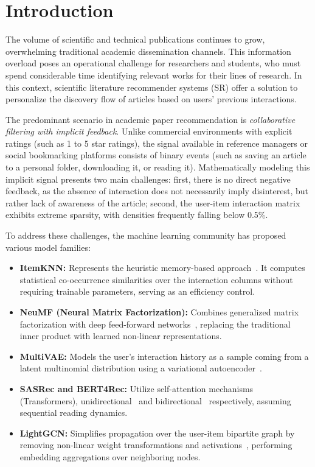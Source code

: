 \documentclass[journal]{IEEEtran}
\begin{document}
\section{Introduction}
The volume of scientific and technical publications continues to grow, overwhelming traditional academic dissemination channels. This information overload poses an operational challenge for researchers and students, who must spend considerable time identifying relevant works for their lines of research. In this context, scientific literature recommender systems (SR) offer a solution to personalize the discovery flow of articles based on users' previous interactions.

The predominant scenario in academic paper recommendation is \emph{collaborative filtering with implicit feedback}. Unlike commercial environments with explicit ratings (such as 1 to 5 star ratings), the signal available in reference managers or social bookmarking platforms consists of binary events (such as saving an article to a personal folder, downloading it, or reading it). Mathematically modeling this implicit signal presents two main challenges: first, there is no direct negative feedback, as the absence of interaction does not necessarily imply disinterest, but rather lack of awareness of the article; second, the user-item interaction matrix exhibits extreme sparsity, with densities frequently falling below 0.5\%.

To address these challenges, the machine learning community has proposed various model families:
\begin{itemize}
    \item \textbf{ItemKNN:} Represents the heuristic memory-based approach~\cite{sarwar2001item}. It computes statistical co-occurrence similarities over the interaction columns without requiring trainable parameters, serving as an efficiency control.
    \item \textbf{NeuMF (Neural Matrix Factorization):} Combines generalized matrix factorization with deep feed-forward networks~\cite{he2017neural}, replacing the traditional inner product with learned non-linear representations.
    \item \textbf{MultiVAE:} Models the user's interaction history as a sample coming from a latent multinomial distribution using a variational autoencoder~\cite{liang2018variational}.
    \item \textbf{SASRec and BERT4Rec:} Utilize self-attention mechanisms (Transformers), unidirectional~\cite{kang2018self} and bidirectional~\cite{sun2019bert4rec} respectively, assuming sequential reading dynamics.
    \item \textbf{LightGCN:} Simplifies propagation over the user-item bipartite graph by removing non-linear weight transformations and activations~\cite{he2020lightgcn}, performing embedding aggregations over neighboring nodes.
\end{itemize}
\end{document}
